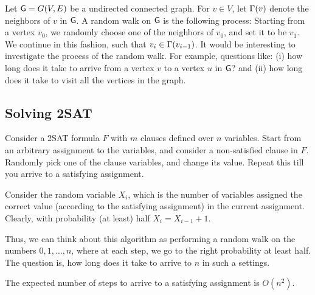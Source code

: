 
Let $\mathsf{G}= G(V,E)$ be a undirected connected graph. For $v \in V$,
let $\Gamma(v)$ denote the neighbors of $v$ in $\mathsf{G}$. A random walk
on $\mathsf{G}$ is the following process: Starting from a vertex $v_0$, we
randomly choose one of the neighbors of $v_0$, and set it to be
$v_1$. We continue in this fashion, such that $v_i \in
\Gamma(v_{i-1})$. It would be interesting to investigate the process of
the random walk. For example, questions like: (i) how long does it
take to arrive from a vertex $v$ to a vertex $u$ in $\mathsf{G}$? and (ii)
how long does it take to visit all the vertices in the graph.

\subsection{Solving 2SAT}

Consider a 2SAT formula $F$ with $m$ clauses defined over $n$
variables. Start from an arbitrary assignment to the variables, and
consider a non-satisfied clause in $F$. Randomly pick one of the
clause variables, and change its value. Repeat this till you arrive to
a satisfying assignment.

Consider the random variable $X_i$, which is the number of variables
assigned the correct value (according to the satisfying assignment) in
the current assignment. Clearly, with probability (at least) half $X_i
= X_{i-1}+1$.

Thus, we can think about this algorithm as performing a random walk on
the numbers $0, 1,\ldots, n$, where at each step, we go to the right
probability at least half. The question is, how long does it take to
arrive to $n$ in such a settings.

\begin{theorem}
    The expected number of steps to arrive to a satisfying assignment
    is $O(n^2)$.
\end{theorem}

